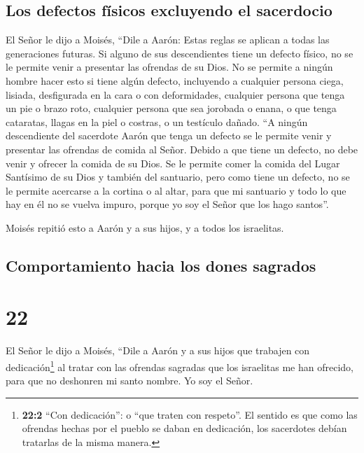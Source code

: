 \hypertarget{los-defectos-fuxedsicos-excluyendo-el-sacerdocio}{%
\subsection{Los defectos físicos excluyendo el
sacerdocio}\label{los-defectos-fuxedsicos-excluyendo-el-sacerdocio}}

 El Señor le dijo a Moisés,  ``Dile a
Aarón: Estas reglas se aplican a todas las generaciones futuras. Si
alguno de sus descendientes tiene un defecto físico, no se le permite
venir a presentar las ofrendas de su Dios.  No se permite
a ningún hombre hacer esto si tiene algún defecto, incluyendo a
cualquier persona ciega, lisiada, desfigurada en la cara o con
deformidades,  cualquier persona que tenga un pie o brazo
roto,  cualquier persona que sea jorobada o enana, o que
tenga cataratas, llagas en la piel o costras, o un testículo dañado.
 ``A ningún descendiente del sacerdote Aarón que tenga un
defecto se le permite venir y presentar las ofrendas de comida al Señor.
Debido a que tiene un defecto, no debe venir y ofrecer la comida de su
Dios.  Se le permite comer la comida del Lugar Santísimo
de su Dios y también del santuario,  pero como tiene un
defecto, no se le permite acercarse a la cortina o al altar, para que mi
santuario y todo lo que hay en él no se vuelva impuro, porque yo soy el
Señor que los hago santos''.

 Moisés repitió esto a Aarón y a sus hijos, y a todos los
israelitas.

\hypertarget{comportamiento-hacia-los-dones-sagrados}{%
\subsection{Comportamiento hacia los dones
sagrados}\label{comportamiento-hacia-los-dones-sagrados}}

\hypertarget{section-21}{%
\section{22}\label{section-21}}

 El Señor le dijo a Moisés,  ``Dile a Aarón
y a sus hijos que trabajen con dedicación\footnote{\textbf{22:2} ``Con
  dedicación'': o ``que traten con respeto''. El sentido es que como las
  ofrendas hechas por el pueblo se daban en dedicación, los sacerdotes
  debían tratarlas de la misma manera.} al tratar con las ofrendas
sagradas que los israelitas me han ofrecido, para que no deshonren mi
santo nombre. Yo soy el Señor.

